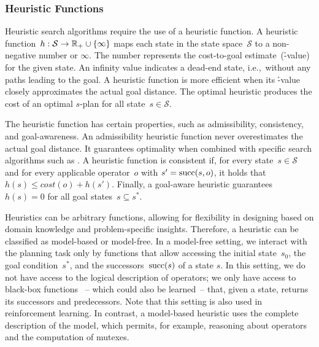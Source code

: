 \subsubsection{Heuristic Functions}
\label{sec:heuristic-functions}

Heuristic search algorithms require the use of a heuristic function. A heuristic function~$h:\mathcal{S}\rightarrow\mathbb{R}_{+}\cup\{\infty\}$ maps each state in the state space~$\mathcal{S}$ to a non-negative number or $\infty$. The number represents the cost-to-goal estimate~(\h-value) for the given state. An infinity value indicates a dead-end state, i.e.,~without any paths leading to the goal. A heuristic function is more efficient when its \h-value closely approximates the actual goal distance. The optimal heuristic \hstar produces the cost of an optimal $s$-plan for all state~$s \in \mathcal{S}$.

The heuristic function has certain properties, such as admissibility, consistency, and goal-awareness. An admissibility heuristic function never overestimates the actual goal distance. It guarantees optimality when combined with specific search algorithms such as \astar. A heuristic function is consistent if, for every state~$s \in \mathcal{S}$ and for every applicable operator~$o$ with $s' = \operatorname{succ}(s,o)$, it holds that $h(s) \leq cost(o) + h(s')$. Finally, a goal-aware heuristic guarantees $h(s) = 0$ for all goal states~$s \subseteq s^*$.

Heuristics can be arbitrary functions, allowing for flexibility in designing based on domain knowledge and problem-specific insights. Therefore, a heuristic can be classified as model-based or model-free. In a model-free setting, we interact with the planning task only by functions that allow accessing the initial state~$s_0$, the goal condition~$s^*$, and the successors~$\operatorname{succ}(s)$ of a state $s$. In this setting, we do not have access to the logical description of operators; we only have access to black-box functions~\cite{Sturtevant2019} -- which could also be learned~-- that, given a state, returns its successors and predecessors. Note that this setting is also used in reinforcement learning.
In contrast, a model-based heuristic uses the complete description of the model, which permits, for example, reasoning about operators and the computation of mutexes.

